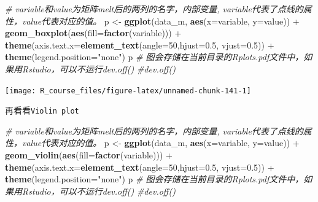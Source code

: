\documentclass[]{article}
\newenvironment{Shaded}{\begin{snugshade}}{\end{snugshade}}
\newcommand{\KeywordTok}[1]{\textcolor[rgb]{0.13,0.29,0.53}{\textbf{{#1}}}}
\newcommand{\DataTypeTok}[1]{\textcolor[rgb]{0.13,0.29,0.53}{{#1}}}
\newcommand{\DecValTok}[1]{\textcolor[rgb]{0.00,0.00,0.81}{{#1}}}
\newcommand{\FloatTok}[1]{\textcolor[rgb]{0.00,0.00,0.81}{{#1}}}
\newcommand{\StringTok}[1]{\textcolor[rgb]{0.31,0.60,0.02}{{#1}}}
\newcommand{\CommentTok}[1]{\textcolor[rgb]{0.56,0.35,0.01}{\textit{{#1}}}}
\newcommand{\NormalTok}[1]{{#1}}
\numberwithin{figure}{section}
\numberwithin{table}{section}
\theoremstyle{definition}
\theoremstyle{definition}
\theoremstyle{definition}
\theoremstyle{remark}
\begin{document}
\begin{Shaded}
\begin{Highlighting}[]
\CommentTok{# variable和value为矩阵melt后的两列的名字，内部变量, variable代表了点线的属性，value代表对应的值。}
\NormalTok{p <-}\StringTok{ }\KeywordTok{ggplot}\NormalTok{(data_m, }\KeywordTok{aes}\NormalTok{(}\DataTypeTok{x=}\NormalTok{variable, }\DataTypeTok{y=}\NormalTok{value)) +}\StringTok{ }
\KeywordTok{geom_boxplot}\NormalTok{(}\KeywordTok{aes}\NormalTok{(}\DataTypeTok{fill=}\KeywordTok{factor}\NormalTok{(variable))) +}\StringTok{ }
\KeywordTok{theme}\NormalTok{(}\DataTypeTok{axis.text.x=}\KeywordTok{element_text}\NormalTok{(}\DataTypeTok{angle=}\DecValTok{50}\NormalTok{,}\DataTypeTok{hjust=}\FloatTok{0.5}\NormalTok{, }\DataTypeTok{vjust=}\FloatTok{0.5}\NormalTok{)) +}
\KeywordTok{theme}\NormalTok{(}\DataTypeTok{legend.position=}\StringTok{"none"}\NormalTok{)}
\NormalTok{p}
\CommentTok{# 图会存储在当前目录的Rplots.pdf文件中，如果用Rstudio，可以不运行dev.off()}
\CommentTok{#dev.off()}
\end{Highlighting}
\end{Shaded}

\begin{center}\texttt{[image: R\_course\_files/figure-latex/unnamed-chunk-141-1]} \end{center}

再看看\texttt{Violin\ plot}

\begin{Shaded}
\begin{Highlighting}[]
\CommentTok{# variable和value为矩阵melt后的两列的名字，内部变量, variable代表了点线的属性，value代表对应的值。}
\NormalTok{p <-}\StringTok{ }\KeywordTok{ggplot}\NormalTok{(data_m, }\KeywordTok{aes}\NormalTok{(}\DataTypeTok{x=}\NormalTok{variable, }\DataTypeTok{y=}\NormalTok{value)) +}\StringTok{ }
\KeywordTok{geom_violin}\NormalTok{(}\KeywordTok{aes}\NormalTok{(}\DataTypeTok{fill=}\KeywordTok{factor}\NormalTok{(variable))) +}\StringTok{ }
\KeywordTok{theme}\NormalTok{(}\DataTypeTok{axis.text.x=}\KeywordTok{element_text}\NormalTok{(}\DataTypeTok{angle=}\DecValTok{50}\NormalTok{,}\DataTypeTok{hjust=}\FloatTok{0.5}\NormalTok{, }\DataTypeTok{vjust=}\FloatTok{0.5}\NormalTok{)) +}
\KeywordTok{theme}\NormalTok{(}\DataTypeTok{legend.position=}\StringTok{"none"}\NormalTok{)}
\NormalTok{p}
\CommentTok{# 图会存储在当前目录的Rplots.pdf文件中，如果用Rstudio，可以不运行dev.off()}
\CommentTok{#dev.off()}
\end{Highlighting}
\end{Shaded}
\end{document}
